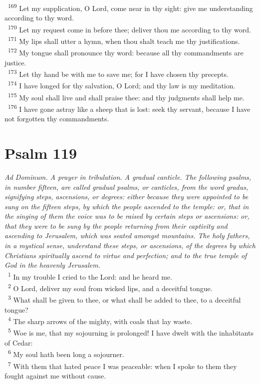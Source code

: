 \documentclass[a5paper,12pt]{article}
\begin{document}
\begin{multicols*}{2}
~\textsuperscript{169} Let my supplication, O Lord, come near in thy sight: give me understanding according to thy word.\\
~\textsuperscript{170} Let my request come in before thee; deliver thou me according to thy word.\\
~\textsuperscript{171} My lips shall utter a hymn, when thou shalt teach me thy justifications.\\
~\textsuperscript{172} My tongue shall pronounce thy word: because all thy commandments are justice.\\
~\textsuperscript{173} Let thy hand be with me to save me; for I have chosen thy precepts.\\
~\textsuperscript{174} I have longed for thy salvation, O Lord; and thy law is my meditation.\\
~\textsuperscript{175} My soul shall live and shall praise thee: and thy judgments shall help me.\\
~\textsuperscript{176} I have gone astray like a sheep that is lost: seek thy servant, because I have not forgotten thy commandments.\\

\section{Psalm 119}
\label{sec:org786dcf6}
\emph{Ad Dominum. A prayer in tribulation. A gradual canticle. The following psalms, in number fifteen, are called gradual psalms, or canticles, from the word gradus, signifying steps, ascensions, or degrees: either because they were appointed to be sung on the fifteen steps, by which the people ascended to the temple: or, that in the singing of them the voice was to be raised by certain steps or ascensions: or, that they were to be sung by the people returning from their captivity and ascending to Jerusalem, which was seated amongst mountains. The holy fathers, in a mystical sense, understand these steps, or ascensions, of the degrees by which Christians spiritually ascend to virtue and perfection; and to the true temple of God in the heavenly Jerusalem.}\\

~\textsuperscript{1} In my trouble I cried to the Lord: and he heard me.\\
~\textsuperscript{2} O Lord, deliver my soul from wicked lips, and a deceitful tongue.\\
~\textsuperscript{3} What shall be given to thee, or what shall be added to thee, to a deceitful tongue?\\
~\textsuperscript{4} The sharp arrows of the mighty, with coals that lay waste.\\
~\textsuperscript{5} Woe is me, that my sojourning is prolonged! I have dwelt with the inhabitants of Cedar:\\
~\textsuperscript{6} My soul hath been long a sojourner.\\
~\textsuperscript{7} With them that hated peace I was peaceable: when I spoke to them they fought against me without cause.\\


\end{multicols*}
\end{document}
